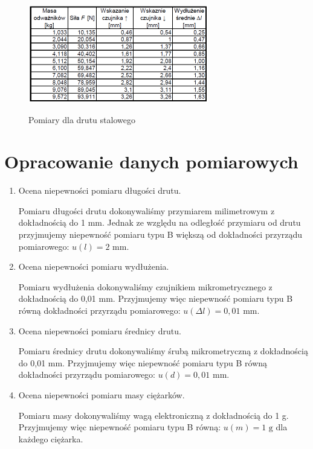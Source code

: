 \documentclass [a4paper,11pt]{article}
\begin{document}
\begin{itemize}
	\begin{figure}[!h]
		\centering
		\caption{Pomiary dla drutu stalowego}
		\includegraphics[width=0.7\textwidth]{tabstal}
		\label{fig:tabstal}
	\end{figure}
		
	\end{itemize}

	\renewcommand*{\figurename}{Wykres} 
	\setcounter{figure}{0}
	
	\section{Opracowanie danych pomiarowych}\label{sec:opr}
	\begin{enumerate}[label=\alph*)]
		\item Ocena niepewności pomiaru długości drutu.
		
		Pomiaru długości drutu dokonywaliśmy przymiarem milimetrowym z dokładnością do 1 mm. Jednak ze względu na odległość przymiaru od drutu przyjmujemy niepewność pomiaru typu B większą od dokładności przyrządu pomiarowego: $u(l) = 2 \text{ mm}$.
		
		\item Ocena niepewności pomiaru wydłużenia.
		
		Pomiaru wydłużenia dokonywaliśmy czujnikiem mikrometrycznego z dokładnością do 0,01 mm. Przyjmujemy więc niepewność pomiaru typu B równą dokładności przyrządu pomiarowego: $u(\Delta l) = 0,01 \text{ mm}$.
		
		\item Ocena niepewności pomiaru średnicy drutu.
		
		Pomiaru średnicy drutu dokonywaliśmy śrubą mikrometryczną z dokładnością do 0,01 mm. Przyjmujemy więc niepewność pomiaru typu B równą dokładności przyrządu pomiarowego: $u(d) = 0,01 \text{ mm}$.
		
		\item Ocena niepewności pomiaru masy ciężarków.
		
		Pomiaru masy dokonywaliśmy wagą elektroniczną z dokładnością do 1 g. Przyjmujemy więc niepewność pomiaru typu B równą: $u(m) = 1 \text{ g}$ dla każdego ciężarka.
	\end{enumerate}
	
\end{document}
